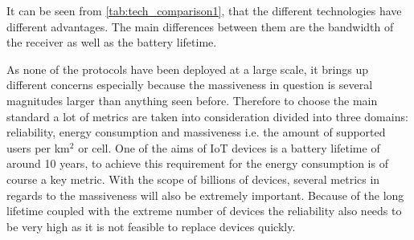 
It can be seen from \autoref{tab:tech_comparison1}, that the different technologies have different advantages. The main differences between them are the bandwidth of the receiver as well as the battery lifetime. 

As none of the protocols have been deployed at a large scale, it brings up different concerns especially because the massiveness in question is several magnitudes larger than anything seen before. Therefore to choose the main standard a lot of metrics are taken into consideration divided into three domains: reliability, energy consumption and massiveness i.e. the amount of supported users per km$^2$ or cell. One of the aims of \gls{IoT} devices is a battery lifetime of around 10 years, to achieve this requirement for the energy consumption is of course a key metric. With the scope of billions of devices, several metrics in regards to the massiveness will also be extremely important. Because of the long lifetime coupled with the extreme number of devices the reliability also needs to be very high as it is not feasible to replace devices quickly. 

